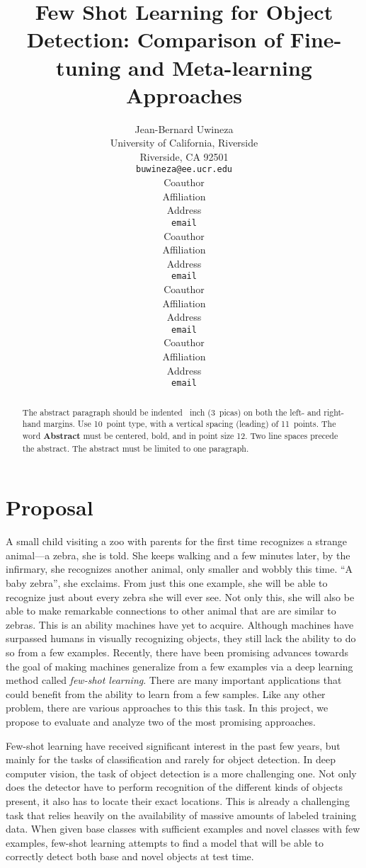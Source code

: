 \documentclass{article}
\title{Few Shot Learning for Object Detection: 
Comparison of Fine-tuning and Meta-learning Approaches}
\author{%
  Jean-Bernard Uwineza 
  \\
  University of California, Riverside\\
  Riverside, CA 92501 \\
  \texttt{buwineza@ee.ucr.edu} \\
  \And
  Coauthor \\
  Affiliation \\
  Address \\
  \texttt{email} \\
  \AND
  Coauthor \\
  Affiliation \\
  Address \\
  \texttt{email} \\
  \And
  Coauthor \\
  Affiliation \\
  Address \\
  \texttt{email} \\
  \And
  Coauthor \\
  Affiliation \\
  Address \\
  \texttt{email} \\
}
\begin{document}
\maketitle

\begin{abstract} %
  The abstract paragraph should be indented ~inch (3~picas) on
  both the left- and right-hand margins. Use 10~point type, with a vertical
  spacing (leading) of 11~points.  The word \textbf{Abstract} must be centered,
  bold, and in point size 12. Two line spaces precede the abstract. The abstract
  must be limited to one paragraph.
\end{abstract}

\section{Proposal}

A small child visiting a zoo with parents for the first time recognizes a strange animal---a zebra,
she is told. She keeps walking and a few minutes later, by the infirmary, she recognizes another animal, 
only smaller and wobbly this time. ``A baby zebra'', she exclaims. From just this one example,
she will be able to recognize just about every zebra she will ever see. Not only this, 
she will also be able to make remarkable connections to other animal that are are similar to zebras. 
This is an ability machines have yet to acquire. Although machines have surpassed humans in visually 
recognizing objects, they still lack the ability to do so from a few examples. Recently,
there have been promising advances towards the goal of making machines generalize from a few
examples via a deep learning method called \textit{few-shot learning}. 
There are many important applications that could benefit from the ability to learn from a few 
samples. Like any other problem, there are various approaches to this this task.
In this project, we propose to evaluate and analyze two of the most promising approaches. 

Few-shot learning have received significant interest in the past few years, 
but mainly for the tasks of classification and rarely for object detection. 
In deep computer vision, the task of object detection is a more challenging one. 
Not only does the detector have to perform recognition of the different kinds of objects present,
it also has to locate their exact locations. This is already a challenging task that relies heavily 
on the availability of massive amounts of labeled training data. When given base classes with 
sufficient examples and novel classes with few examples, few-shot learning attempts to find
a model that will be able to correctly detect both base and novel objects at test time. 
\end{document}
